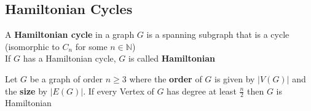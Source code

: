 \subsection{Hamiltonian Cycles}

\begin{definition}\label{1.11}
    A \textbf{Hamiltonian cycle} in a graph $G$ is a spanning subgraph that is a cycle (isomorphic to $C_n$ for some $n\in\mathbb{N}$)\\
    If $G$ has a Hamiltonian cycle, $G$ is called \textbf{Hamiltonian} 
\end{definition}

\vspace{0.5cm}

\begin{theorem}\label{1.12}
    Let $G$ be a graph of order $n\geq 3$ where the \textbf{order} of $G$ is given by $|V(G)|$ and the \textbf{size} by $|E(G)|$. If every Vertex of $G$ has degree at least $\frac{n}{2}$ then $G$ is Hamiltonian 
\end{theorem}

\vspace{0.5cm}

